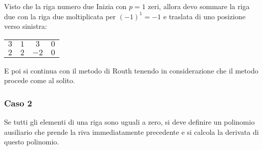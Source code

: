 Visto che la riga numero due Inizia con $p=1$ zeri, allora devo sommare la riga due
con la riga due moltiplicata per $(-1)^1 = -1$ e traslata di uno posizione verso
sinistra:

\begin{table}[h!]
    \centering
    \begin{tabular}{c | c c c}
        $3$ & $1$ & $3$ & $0$ \\
        $2$ & $2$ & $-2$ & $0$ \\
    \end{tabular}
\end{table}

E poi si continua con il metodo di Routh tenendo in considerazione che 
il metodo procede come al solito.

\subsubsection{Caso 2}
Se tutti gli elementi di una riga sono uguali a zero, si deve definire un polinomio ausiliario
che prende la riva immediatamente precedente e si calcola la derivata di questo polinomio.

